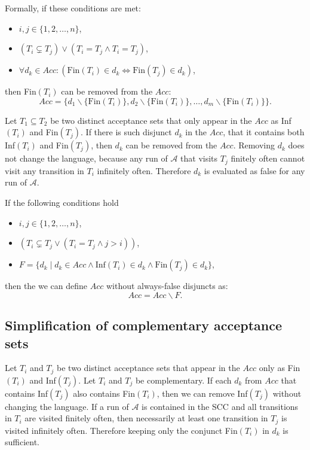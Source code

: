\documentclass[
  digital, %
  twoside, %
  table,   %
  lof,     %
  lot,     %
]{fithesis3}
\begin{document}
Formally, if these conditions are met:
\begin{itemize}
  \item $i, j \in \{1,2, \dots, n\}$,
  \item $(T_i \subsetneq T_j) \vee (T_i = T_j \wedge T_i = T_j)$,
  \item $\forall d_k \in Acc \colon (\text{Fin}(T_i) \in d_k \Leftrightarrow \text{Fin}(T_j) \in d_k)$,
\end{itemize}
then Fin$(T_i)$ can be removed from the $Acc$:
\begin{equation*}
  Acc = \{d_1 \smallsetminus \{\text{Fin}(T_i)\}, d_2 \smallsetminus \{\text{Fin}(T_i)\}, \dots, d_m \smallsetminus \{\text{Fin}(T_i)\}\}.
\end{equation*}

Let $T_1 \subseteq T_2$ be two distinct acceptance sets that only appear in the $Acc$ as Inf$(T_i)$ and Fin$(T_j)$. If there is such disjunct $d_k$ in the $Acc$, that it contains both Inf$(T_i)$ and Fin$(T_j)$, then $d_k$ can be removed from the $Acc$. Removing $d_k$ does not change the language, because any run of $\mathcal{A}$ that visits $T_j$ finitely often cannot visit any transition in $T_i$ infinitely often. Therefore $d_k$ is evaluated as false for any run of $\mathcal{A}$. 

If the following conditions hold
\begin{itemize}
  \item $i, j \in \{1, 2, \dots, n\}$,
  \item $(T_i \subsetneq T_j \vee (T_i = T_j \wedge j > i))$,
  \item $F = \{d_k \mid d_k \in Acc \wedge \text{Inf}(T_i) \in d_k \wedge \text{Fin}(T_j) \in d_k \}$,
\end{itemize}
then the we can define $Acc$ without always-false disjuncts as:
\begin{equation*}
  Acc = Acc \smallsetminus F.
\end{equation*}

\subsection{Simplification of complementary acceptance sets}
Let $T_i$ and $T_j$ be two distinct acceptance sets that appear in the $Acc$ only as Fin$(T_i)$ and Inf$(T_j)$. Let $T_i$ and $T_j$ be complementary. If each $d_k$ from $Acc$ that contains Inf$(T_j)$ also contains Fin$(T_i)$, then we can remove Inf$(T_j)$ without changing the language. If a run of $\mathcal{A}$ is contained in the SCC and all transitions in $T_i$ are visited finitely often, then necessarily at least one transition in $T_j$ is visited infinitely often. Therefore keeping only the conjunct Fin$(T_i)$ in $d_k$ is sufficient. 
\end{document}
